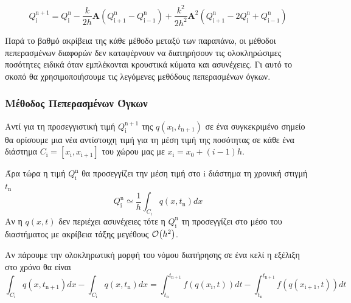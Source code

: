  \begin{equation}
 Q_{\mathrm{i}}^\mathrm{n+1} = Q_{\mathrm{i}}^\mathrm{n} -\frac{k}{2h} \mathbf{Α} \left( Q_\mathrm{i+1}^\mathrm{n} - Q_\mathrm{i-1}^\mathrm{n} \right) +\frac{k^2}{2h^2} \mathbf{Α}^2 \left( Q_\mathrm{i+1}^\mathrm{n} - 2Q_{\mathrm{i}}^\mathrm{n}+ Q_\mathrm{i-1}^\mathrm{n} \right)
 \end{equation} 
 
 Παρά το βαθμό ακρίβεια της κάθε μέθοδο μεταξύ των παραπάνω, οι μέθοδοι πεπερασμένων διαφορών δεν καταφέρνουν να διατηρήσουν τις ολοκληρώσιμες ποσότητες ειδικά όταν εμπλέκονται κρουστικά κύματα και ασυνέχειες. Γι αυτό το σκοπό θα χρησιμοποιήσουμε τις λεγόμενες μεθόδους πεπερασμένων όγκων.
 
\subsubsection{Μέθοδος Πεπερασμένων Όγκων}
Αντί για τη προσεγγιστική τιμή $Q_{\mathrm{i}}^\mathrm{n+1}$ της $q(x_\mathrm{i},t_\mathrm{n+1})$ σε ένα συγκεκριμένο σημείο θα ορίσουμε μια νέα αντίστοιχη τιμή για τη μέση τιμή της ποσότητας σε κάθε ένα διάστημα $C_\mathrm{i}=[x_\mathrm{i},x_\mathrm{i+1}]$ του χώρου μας με $x_\mathrm{i}=x_0+(i-1)h$. 

Άρα τώρα η τιμή $Q_{\mathrm{i}}^\mathrm{n}$ θα προσεγγίζει την μέση τιμή στο $\mathrm{i}$ διάστημα τη χρονική στιγμή $t_\mathrm{n}$
\begin{equation}
Q_{\mathrm{i}}^\mathrm{n} \simeq \frac{1}{h} \int _{C_\mathrm{i}} q(x,t_\mathrm{n})dx
\end{equation}
Αν η $q(x,t)$ δεν περιέχει ασυνέχειες τότε η $Q_{\mathrm{i}}^\mathrm{n}$ τη προσεγγίζει στο μέσο του διαστήματος με ακρίβεια τάξης μεγέθους $\order{h^2}$.

Αν πάρουμε την ολοκληρωτική μορφή του νόμου διατήρησης σε ένα κελί η εξέλιξη στο χρόνο θα είναι
\begin{equation}
\int _{C_\mathrm{i}} q(x,t_\mathrm{n+1})dx -\int _{C_\mathrm{i}} q(x,t_\mathrm{n})dx = 
\int_{t_\mathrm{n}}^{t_\mathrm{n+1}} f(q(x_\mathrm{i},t))dt - \int_{t_\mathrm{n}}^{t_\mathrm{n+1}} f(q(x_\mathrm{i+1},t))dt
\end{equation}



